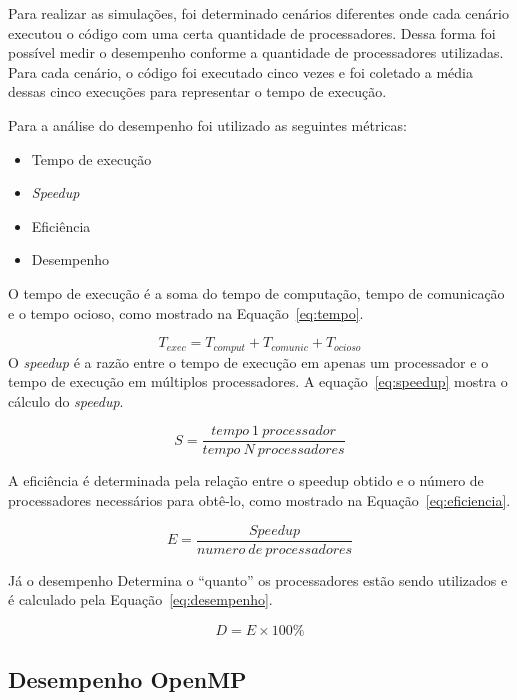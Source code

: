 Para realizar as simulações, foi determinado cenários diferentes onde cada
cenário executou o código com uma certa quantidade de processadores. Dessa forma
foi possível medir o desempenho conforme a quantidade de processadores
utilizadas. Para cada cenário, o código foi executado cinco vezes e foi coletado
a média dessas cinco execuções para representar o tempo de execução.

Para a análise do desempenho foi utilizado as seguintes métricas:

\begin{itemize}
\item Tempo de execução
\item \textit{Speedup}
\item Eficiência
\item Desempenho
\end{itemize}

O tempo de execução é a soma do tempo de computação, tempo de comunicação e o
tempo ocioso, como mostrado na Equação~\ref{eq:tempo}. 

\begin{equation}
\label{eq:tempo}
T_{exec} = T_{comput} + T_{comunic} + T_{ocioso}
\end{equation}
O \textit{speedup} é a razão entre o tempo de execução em apenas um
processador e o tempo de execução em múltiplos processadores. A
equação~\ref{eq:speedup} mostra o cálculo do \textit{speedup}.

\begin{equation}
\label{eq:speedup}
S = \frac{tempo~1~processador}{tempo~N~processadores}
\end{equation}

A eficiência é determinada pela relação entre o speedup obtido e o
número de processadores necessários para obtê-lo, como mostrado na
Equação~\ref{eq:eficiencia}.

\begin{equation}
\label{eq:eficiencia}
E = \frac{Speedup}{numero~de~processadores}
\end{equation}

Já o desempenho Determina o ``quanto'' os processadores estão sendo
utilizados e é calculado pela Equação~\ref{eq:desempenho}.

\begin{equation}
\label{eq:desempenho}
D = E\times100\%
\end{equation}


\subsection{Desempenho OpenMP}

